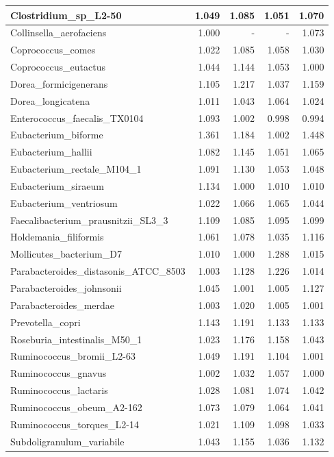 \documentclass[12pt,a4paper]{article}
\begin{document}
\begin{table}[ht]
\begin{center}
\begin{tabular}{|l*{4}{|r}|}
Clostridium\_sp\_L2-50 & 1.049 & 1.085 & 1.051 & 1.070 \\ \hline
Collinsella\_aerofaciens & 1.000 & - & - & 1.073 \\ \hline
Coprococcus\_comes & 1.022 & 1.085 & 1.058 & 1.030 \\ \hline
Coprococcus\_eutactus & 1.044 & 1.144 & 1.053 & 1.000 \\ \hline
Dorea\_formicigenerans & 1.105 & 1.217 & 1.037 & 1.159 \\ \hline
Dorea\_longicatena & 1.011 & 1.043 & 1.064 & 1.024 \\ \hline
Enterococcus\_faecalis\_TX0104 & 1.093 & 1.002 & 0.998 & 0.994 \\ \hline
Eubacterium\_biforme & 1.361 & 1.184 & 1.002 & 1.448 \\ \hline
Eubacterium\_hallii & 1.082 & 1.145 & 1.051 & 1.065 \\ \hline
Eubacterium\_rectale\_M104\_1 & 1.091 & 1.130 & 1.053 & 1.048 \\ \hline
Eubacterium\_siraeum & 1.134 & 1.000 & 1.010 & 1.010 \\ \hline
Eubacterium\_ventriosum & 1.022 & 1.066 & 1.065 & 1.044 \\ \hline
Faecalibacterium\_prausnitzii\_SL3\_3 & 1.109 & 1.085 & 1.095 & 1.099 \\ \hline
Holdemania\_filiformis & 1.061 & 1.078 & 1.035 & 1.116 \\ \hline
Mollicutes\_bacterium\_D7 & 1.010 & 1.000 & 1.288 & 1.015 \\ \hline
Parabacteroides\_distasonis\_ATCC\_8503 & 1.003 & 1.128 & 1.226 & 1.014 \\ \hline
Parabacteroides\_johnsonii & 1.045 & 1.001 & 1.005 & 1.127 \\ \hline
Parabacteroides\_merdae & 1.003 & 1.020 & 1.005 & 1.001 \\ \hline
Prevotella\_copri & 1.143 & 1.191 & 1.133 & 1.133 \\ \hline
Roseburia\_intestinalis\_M50\_1 & 1.023 & 1.176 & 1.158 & 1.043 \\ \hline
Ruminococcus\_bromii\_L2-63 & 1.049 & 1.191 & 1.104 & 1.001 \\ \hline
Ruminococcus\_gnavus & 1.002 & 1.032 & 1.057 & 1.000 \\ \hline
Ruminococcus\_lactaris & 1.028 & 1.081 & 1.074 & 1.042 \\ \hline
Ruminococcus\_obeum\_A2-162 & 1.073 & 1.079 & 1.064 & 1.041 \\ \hline
Ruminococcus\_torques\_L2-14 & 1.021 & 1.109 & 1.098 & 1.033 \\ \hline
Subdoligranulum\_variabile & 1.043 & 1.155 & 1.036 & 1.132 \\ \hline
\end{tabular}
\end{center}
\end{table}
\end{document}
